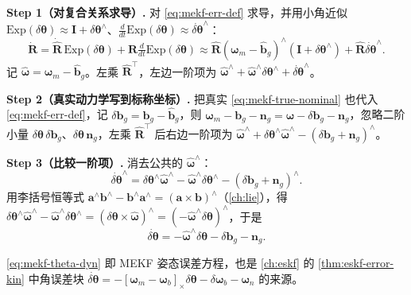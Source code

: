 \begin{derivation}
\label{deriv:mekf-theta}
\textbf{Step 1（对复合关系求导）.}\; 对 \cref{eq:mekf-err-def} 求导，并用小角近似 $\mathrm{Exp}(\delta\boldsymbol{\theta})\approx\mathbf{I}+\delta\boldsymbol{\theta}^\wedge$、$\tfrac{d}{dt}\mathrm{Exp}(\delta\boldsymbol{\theta})\approx\dot{\delta\boldsymbol{\theta}}^\wedge$：
\[
  \dot{\mathbf{R}}=\dot{\hat{\mathbf{R}}}\,\mathrm{Exp}(\delta\boldsymbol{\theta})+\hat{\mathbf{R}}\tfrac{d}{dt}\mathrm{Exp}(\delta\boldsymbol{\theta})
  \approx\hat{\mathbf{R}}(\boldsymbol{\omega}_m-\hat{\mathbf{b}}_g)^\wedge(\mathbf{I}+\delta\boldsymbol{\theta}^\wedge)+\hat{\mathbf{R}}\dot{\delta\boldsymbol{\theta}}^\wedge.
\]
记 $\hat{\boldsymbol{\omega}}=\boldsymbol{\omega}_m-\hat{\mathbf{b}}_g$。左乘 $\hat{\mathbf{R}}^\top$，左边一阶项为 $\hat{\boldsymbol{\omega}}^\wedge+\hat{\boldsymbol{\omega}}^\wedge\delta\boldsymbol{\theta}^\wedge+\dot{\delta\boldsymbol{\theta}}^\wedge$。

\textbf{Step 2（真实动力学写到标称坐标）.}\; 把真实 \cref{eq:mekf-true-nominal} 也代入 \cref{eq:mekf-err-def}，记 $\delta\mathbf{b}_g=\mathbf{b}_g-\hat{\mathbf{b}}_g$，则 $\boldsymbol{\omega}_m-\mathbf{b}_g-\mathbf{n}_g=\hat{\boldsymbol{\omega}}-\delta\mathbf{b}_g-\mathbf{n}_g$，忽略二阶小量 $\delta\boldsymbol{\theta}\,\delta\mathbf{b}_g$、$\delta\boldsymbol{\theta}\,\mathbf{n}_g$，左乘 $\hat{\mathbf{R}}^\top$ 后右边一阶项为 $\hat{\boldsymbol{\omega}}^\wedge+\delta\boldsymbol{\theta}^\wedge\hat{\boldsymbol{\omega}}^\wedge-(\delta\mathbf{b}_g+\mathbf{n}_g)^\wedge$。

\textbf{Step 3（比较一阶项）.}\; 消去公共的 $\hat{\boldsymbol{\omega}}^\wedge$：
\[
  \dot{\delta\boldsymbol{\theta}}^\wedge=\delta\boldsymbol{\theta}^\wedge\hat{\boldsymbol{\omega}}^\wedge-\hat{\boldsymbol{\omega}}^\wedge\delta\boldsymbol{\theta}^\wedge-(\delta\mathbf{b}_g+\mathbf{n}_g)^\wedge.
\]
用李括号恒等式 $\mathbf{a}^\wedge\mathbf{b}^\wedge-\mathbf{b}^\wedge\mathbf{a}^\wedge=(\mathbf{a}\times\mathbf{b})^\wedge$（\cref{ch:lie}），得 $\delta\boldsymbol{\theta}^\wedge\hat{\boldsymbol{\omega}}^\wedge-\hat{\boldsymbol{\omega}}^\wedge\delta\boldsymbol{\theta}^\wedge=(\delta\boldsymbol{\theta}\times\hat{\boldsymbol{\omega}})^\wedge=(-\hat{\boldsymbol{\omega}}^\wedge\delta\boldsymbol{\theta})^\wedge$，于是
\begin{equation}
  \boxed{\;\dot{\delta\boldsymbol{\theta}}=-\hat{\boldsymbol{\omega}}^\wedge\delta\boldsymbol{\theta}-\delta\mathbf{b}_g-\mathbf{n}_g.\;}
  \label{eq:mekf-theta-dyn}
\end{equation}
\end{derivation}
\cref{eq:mekf-theta-dyn} 即 MEKF 姿态误差方程，也是 \cref{ch:eskf} 的 \cref{thm:eskf-error-kin} 中角误差块 $\dot{\delta\boldsymbol{\theta}}=-[\boldsymbol{\omega}_m-\boldsymbol{\omega}_b]_\times\delta\boldsymbol{\theta}-\delta\boldsymbol{\omega}_b-\boldsymbol{\omega}_n$ 的来源。

